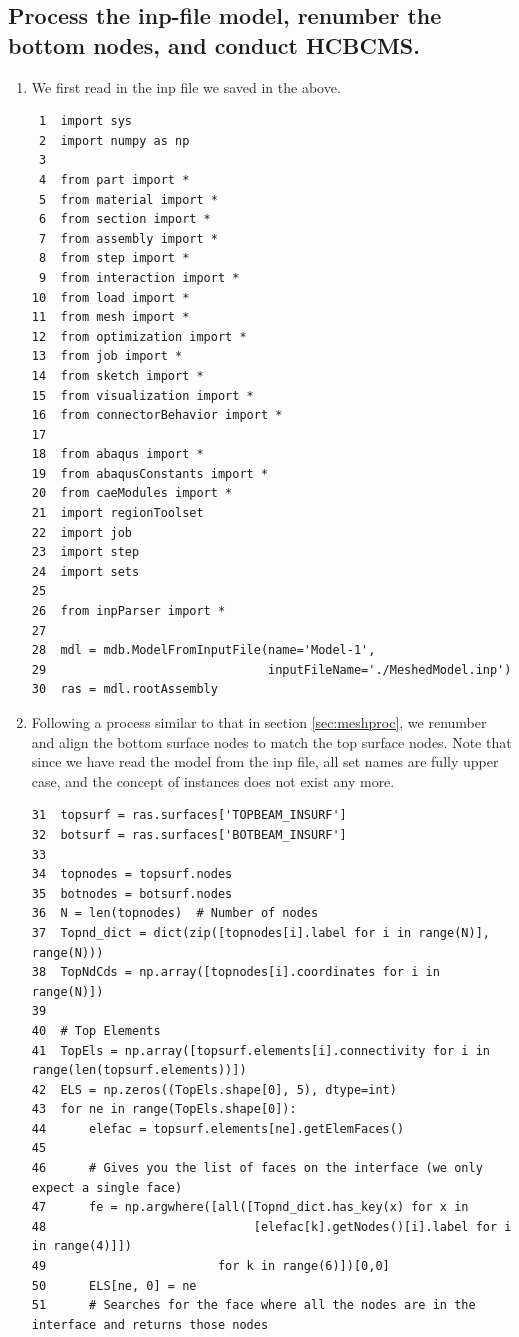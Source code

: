 \documentclass[11pt]{article}
\begin{document}
\subsection{Process the inp-file model, renumber the bottom nodes, and conduct HCBCMS.}
\label{sec:org0b8c943}
\begin{enumerate}
\item We first read in the inp file we saved in the above.
\begin{verbatim}
 1  import sys
 2  import numpy as np
 3  
 4  from part import *
 5  from material import *
 6  from section import *
 7  from assembly import *
 8  from step import *
 9  from interaction import *
10  from load import *
11  from mesh import *
12  from optimization import *
13  from job import *
14  from sketch import *
15  from visualization import *
16  from connectorBehavior import *
17  
18  from abaqus import *
19  from abaqusConstants import *
20  from caeModules import * 
21  import regionToolset
22  import job
23  import step
24  import sets
25  
26  from inpParser import *
27  
28  mdl = mdb.ModelFromInputFile(name='Model-1',
29                               inputFileName='./MeshedModel.inp')
30  ras = mdl.rootAssembly
\end{verbatim}
\item Following a process similar to that in section \ref{sec:meshproc}, we renumber and align the bottom surface nodes to match the top surface nodes.
Note that since we have read the model from the inp file, all set names are fully upper case, and the concept of instances does not exist any more.
\begin{verbatim}
31  topsurf = ras.surfaces['TOPBEAM_INSURF']
32  botsurf = ras.surfaces['BOTBEAM_INSURF']
33  
34  topnodes = topsurf.nodes
35  botnodes = botsurf.nodes
36  N = len(topnodes)  # Number of nodes
37  Topnd_dict = dict(zip([topnodes[i].label for i in range(N)], range(N)))
38  TopNdCds = np.array([topnodes[i].coordinates for i in range(N)])
39  
40  # Top Elements
41  TopEls = np.array([topsurf.elements[i].connectivity for i in range(len(topsurf.elements))])
42  ELS = np.zeros((TopEls.shape[0], 5), dtype=int)
43  for ne in range(TopEls.shape[0]):
44      elefac = topsurf.elements[ne].getElemFaces()
45  
46      # Gives you the list of faces on the interface (we only expect a single face)
47      fe = np.argwhere([all([Topnd_dict.has_key(x) for x in 
48                             [elefac[k].getNodes()[i].label for i in range(4)]])
49                        for k in range(6)])[0,0]
50      ELS[ne, 0] = ne
51      # Searches for the face where all the nodes are in the interface and returns those nodes

\end{verbatim}
\end{enumerate}
\end{document}
